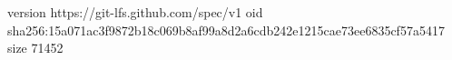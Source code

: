 version https://git-lfs.github.com/spec/v1
oid sha256:15a071ac3f9872b18c069b8af99a8d2a6cdb242e1215cae73ee6835cf57a5417
size 71452
